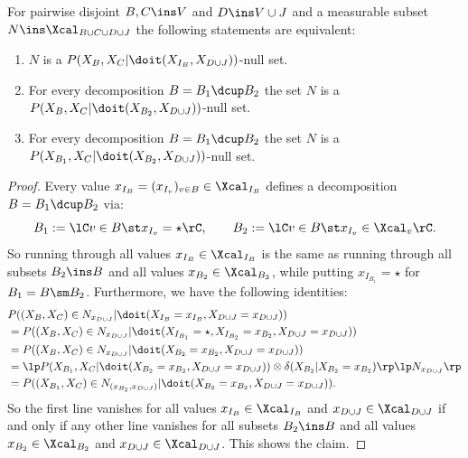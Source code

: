 \begin{Lem}
    \label{lem:int-null-set}
    For pairwise disjoint $B,C \ins V$ and $D \ins V \cup J$ and a measurable subset $N \ins \Xcal_{B \cup C\cup D \cup J}$ the following statements are equivalent:
    \begin{enumerate}
        \item $N$ is a $P(X_B,X_C|\doit(X_{I_B},X_{D\cup J}))$-null set.
        \item For every decomposition $B=B_1 \dcup B_2$ the set $N$ is a 
            $P(X_B,X_C|\doit(X_{B_2},X_{D\cup J}))$-null set.
        \item For every decomposition $B=B_1 \dcup B_2$ the set $N$ is a 
            $P(X_{B_1},X_C|\doit(X_{B_2},X_{D\cup J}))$-null set.
    \end{enumerate}
\begin{proof}
    Every value $x_{I_B}=(x_{I_v})_{v \in B} \in \Xcal_{I_B}$ defines a decomposition $B=B_1 \dcup B_2$ via:
    \[ B_1 := \lC v \in B \st x_{I_v} = \star \rC, \qquad B_2 := \lC v \in B \st x_{I_v} \in \Xcal_v \rC.  \]
    So running through all values $x_{I_B} \in \Xcal_{I_B}$ is the same as running through all subsets $B_2 \ins B$ and all values $x_{B_2} \in \Xcal_{B_2}$, while putting $x_{I_{B_1}}=\star$ for $B_1 = B \sm B_2$.
    Furthermore, we have the following identities:
    \begin{align*}
          &   P((X_B,X_C) \in N_{x_{D\cup J}}|\doit(X_{I_B}=x_{I_B},X_{D\cup J}=x_{D\cup J})) \\
        &=   P((X_B,X_C) \in N_{x_{D\cup J}}|\doit(X_{I_{B_1}} = \star ,X_{I_{B_2}}=x_{B_2},X_{D\cup J}=x_{D\cup J})) \\
     &=   P((X_B,X_C) \in N_{x_{D\cup J}}|\doit(X_{B_2}=x_{B_2},X_{D\cup J}=x_{D\cup J})) \\
     &= \lp P(X_{B_1},X_C|\doit(X_{B_2}=x_{B_2},X_{D\cup J}=x_{D\cup J})) \otimes \delta(X_{B_2}|X_{B_2}=x_{B_2})\rp\lp N_{x_{D\cup J}} \rp \\
     &= P((X_{B_1},X_C) \in N_{(x_{B_2},x_{D\cup J})}|\doit(X_{B_2}=x_{B_2},X_{D\cup J}=x_{D\cup J})).
    \end{align*}
    So the first line vanishes for all values $x_{I_B} \in \Xcal_{I_B}$ and $x_{D\cup J} \in \Xcal_{D\cup J}$ if and only if any other line vanishes
    for all subsets $B_2 \ins B$ and all values $x_{B_2} \in \Xcal_{B_2}$ and $x_{D\cup J} \in \Xcal_{D\cup J}$.
    This shows the claim.
\end{proof}
\end{Lem}


